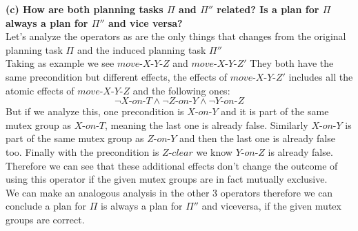 \documentclass[12pt,a4paper]{article}
\begin{document}
	\textbf{(c) How are both planning tasks $\Pi$ and $\Pi''$ related?
	Is a plan for $\Pi$ always a plan for $\Pi''$ and vice 
	versa?}\\
	Let's analyze the operators as are the only things that changes from 
	the original planning task $\Pi$ and the induced planning task $\Pi''$\\
	Taking as example we see $move$-$X$-$Y$-$Z$ and $move$-$X$-$Y$-$Z'$
	They both have the same precondition but different effects, the effects
	of $move$-$X$-$Y$-$Z'$ includes all the atomic effects of $move$-$X$-$Y$-$Z$
	and the following ones:
	\[\neg X\text{-}on\text{-}T \land
	\neg Z\text{-}on\text{-}Y \land
	\neg Y\text{-}on\text{-}Z\]
	But if we analyze this, one precondition is $X\text{-}on\text{-}Y$  and it
	is part of the same mutex group as $X\text{-}on\text{-}T$, meaning the last one is 
	already false. Similarly $X\text{-}on\text{-}Y$ is part
	of the same mutex group as $Z\text{-}on\text{-}Y$ and then the
	last one is already false too.
	Finally with the precondition is $Z\text{-}clear$  we know $Y\text{-}on\text{-}Z$ 
	is already false.\\
	Therefore we can see that these additional effects don't change the outcome of using 
	this operator if the given mutex groups are in fact mutually exclusive.\\
	We can make an analogous analysis in the other 3 operators therefore we can conclude
	a plan for $\Pi$ is always a plan for $\Pi''$ and viceversa, if the given mutex groups
	are correct.
\end{document}
